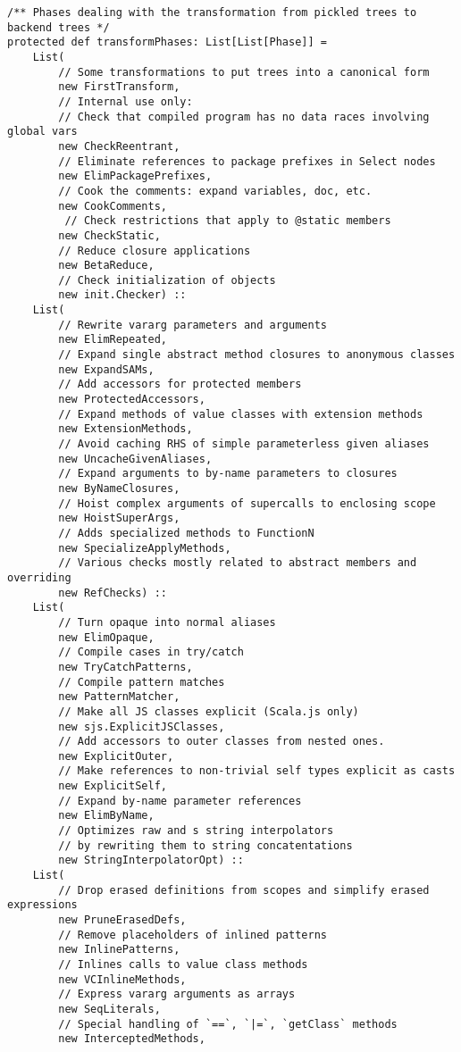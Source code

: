 \documentclass[letterpaper,12pt,titlepage,oneside,final]{book}
\begin{document}
\begin{verbatim}
/** Phases dealing with the transformation from pickled trees to backend trees */
protected def transformPhases: List[List[Phase]] =
	List(
		// Some transformations to put trees into a canonical form
		new FirstTransform,
		// Internal use only: 
		// Check that compiled program has no data races involving global vars         
		new CheckReentrant,
		// Eliminate references to package prefixes in Select nodes         
		new ElimPackagePrefixes,    
		// Cook the comments: expand variables, doc, etc.
		new CookComments,         
		 // Check restrictions that apply to @static members  
		new CheckStatic,   
		// Reduce closure applications        
		new BetaReduce,      
		// Check initialization of objects       
		new init.Checker) ::        
	List(
		// Rewrite vararg parameters and arguments
		new ElimRepeated,    
		// Expand single abstract method closures to anonymous classes       
		new ExpandSAMs,           
		// Add accessors for protected members  
		new ProtectedAccessors,    
		// Expand methods of value classes with extension methods 
		new ExtensionMethods,     
		// Avoid caching RHS of simple parameterless given aliases  
		new UncacheGivenAliases,   
		// Expand arguments to by-name parameters to closures
		new ByNameClosures,         
		// Hoist complex arguments of supercalls to enclosing scope
		new HoistSuperArgs,         
		// Adds specialized methods to FunctionN
		new SpecializeApplyMethods, 
		// Various checks mostly related to abstract members and overriding
		new RefChecks) ::           
	List(
	 	// Turn opaque into normal aliases
		new ElimOpaque,            
		// Compile cases in try/catch
		new TryCatchPatterns,      
		// Compile pattern matches
		new PatternMatcher,         
		// Make all JS classes explicit (Scala.js only)
		new sjs.ExplicitJSClasses,  
		// Add accessors to outer classes from nested ones.
		new ExplicitOuter,          
		// Make references to non-trivial self types explicit as casts
		new ExplicitSelf,           
		// Expand by-name parameter references
		new ElimByName,             
		// Optimizes raw and s string interpolators 
		// by rewriting them to string concatentations
		new StringInterpolatorOpt) :: 
	List(
	 	// Drop erased definitions from scopes and simplify erased expressions
		new PruneErasedDefs,
		// Remove placeholders of inlined patterns       
		new InlinePatterns,    
		// Inlines calls to value class methods     
		new VCInlineMethods,  
		// Express vararg arguments as arrays      
		new SeqLiterals, 
		// Special handling of `==`, `|=`, `getClass` methods           
		new InterceptedMethods, 

\end{verbatim}
\end{document}
